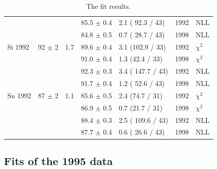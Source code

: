 \begin{table}[h]
\begin{center}
\begin{tabular}{|l||l|l|l|l|l|l|}
                 &                &     & 85.5 $\pm$ 0.4 & 2.1 ( 92.3 / 43) & 1992 & NLL \\
                 &                &     & 84.8 $\pm$ 0.5 & 0.7 ( 28.7 / 43) & 1998 & NLL \\
      \hline                                                                 
       Si 1992   & 92   $\pm$ 2   & 1.7 & 89.6 $\pm$ 0.4 &  3.1 (102.9 / 33)& 1992 & $\chi^2$ \\  
                 &                &     & 91.0 $\pm$ 0.4 &  1.3 (42.4 / 33) & 1998 & $\chi^2$ \\  
                                                                             
                 &                &     & 92.3 $\pm$ 0.3 & 3.4 ( 147.7 / 43)& 1992 & NLL \\
                 &                &     & 91.7 $\pm$ 0.4 & 1.2 ( 52.6 / 43) & 1998 & NLL \\
      \hline                                                                 
       Sn 1992   & 87   $\pm$ 2   & 1.1 & 85.6 $\pm$ 0.5 &  2.4 (74.7 / 31) & 1992 & $\chi^2$ \\  
                 &                &     & 86.9 $\pm$ 0.5 &  0.7 (21.7 / 31) & 1998 & $\chi^2$ \\  
                                                                             
                 &                &     & 88.4 $\pm$ 0.3 & 2.5 ( 109.6 / 43) & 1992 & NLL \\
                 &                &     & 87.7 $\pm$ 0.4 & 0.6 ( 26.6 / 43) & 1998 & NLL \\
      \hline                           
    \end{tabular}
  \end{center}
  \caption{The fit results.}
  \label{table:fits1992}
\end{table}

\subsection { Fits of the 1995 data }


